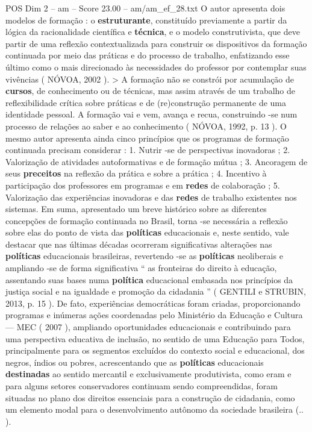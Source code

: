 \begin{textsample}{POS Dim 2 – am – Score 23.00 – am/am\_ef\_28.txt}
O autor apresenta dois modelos de formação : o \textbf{estruturante}, constituído previamente a partir da lógica da racionalidade científica e \textbf{técnica}, e o modelo construtivista, que deve partir de uma reflexão contextualizada para construir os dispositivos da formação continuada por meio das práticas e do processo de trabalho, enfatizando esse último como o mais direcionado às necessidades do professor por contemplar suas vivências ( NÓVOA, 2002 ). > A formação não se constrói por acumulação de \textbf{cursos}, de conhecimento ou de técnicas, mas assim através de um trabalho de reflexibilidade crítica sobre práticas e de (re)construção permanente de uma identidade pessoal.
A formação vai e vem, avança e recua, construindo -se num processo de relações ao saber e ao conhecimento ( NÓVOA, 1992, p. 13 ).
O mesmo autor apresenta ainda cinco princípios que os programas de formação continuada precisam considerar : 1.
Nutrir -se de perspectivas inovadoras ; 2.
Valorização de atividades autoformativas e de formação mútua ; 3.
Ancoragem de seus \textbf{preceitos} na reflexão da prática e sobre a prática ; 4.
Incentivo à participação dos professores em programas e em \textbf{redes} de colaboração ; 5.
Valorização das experiências inovadoras e das \textbf{redes} de trabalho existentes nos sistemas.
Em suma, apresentado um breve histórico sobre as diferentes concepções de formação continuada no Brasil, torna -se necessária a reflexão sobre elas do ponto de vista das \textbf{políticas} educacionais e, neste sentido, vale destacar que nas últimas décadas ocorreram significativas alterações nas \textbf{políticas} educacionais brasileiras, revertendo -se as \textbf{políticas} neoliberais e ampliando -se de forma significativa “ as fronteiras do direito à educação, assentando suas bases numa \textbf{política} educacional embasada nos princípios da justiça social e na igualdade e promoção da cidadania ” ( GENTILI e STRUBIN, 2013, p. 15 ).
De fato, experiências democráticas foram criadas, proporcionando programas e inúmeras ações coordenadas pelo Ministério da Educação e Cultura — MEC ( 2007 ), ampliando oportunidades educacionais e contribuindo para uma perspectiva educativa de inclusão, no sentido de uma Educação para Todos, principalmente para os segmentos excluídos do contexto social e educacional, dos negros, índios ou pobres, acrescentando que as \textbf{políticas} educacionais \textbf{destinadas} ao sentido mercantil e exclusivamente produtivista, como eram e para alguns setores conservadores continuam sendo compreendidas, foram situadas no plano dos direitos essenciais para a construção de cidadania, como um elemento modal para o desenvolvimento autônomo da sociedade brasileira (.. ).

\end{textsample}
